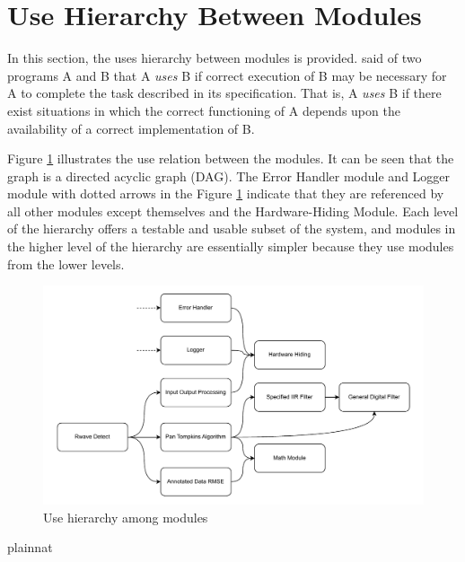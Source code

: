 \documentclass[12pt, titlepage]{article}
\begin{document}
\section{Use Hierarchy Between Modules} \label{SecUse}

In this section, the uses hierarchy between modules is provided.
\citet{Parnas1978} said of two programs A and B that A {\em uses} B if correct
execution of B may be necessary for A to complete the task described in its
specification. That is, A {\em uses} B if there exist situations in which the
correct functioning of A depends upon the availability of a correct
implementation of B.

Figure \ref{FigUH} illustrates the use relation between the modules. It can be
seen that the graph is a directed acyclic graph (DAG).  The Error Handler module
and Logger module with dotted arrows in the Figure \ref{FigUH} indicate that
they are referenced by all other modules except themselves and the
Hardware-Hiding Module.  Each level of the hierarchy offers a testable and
usable subset of the system, and modules in the higher level of the hierarchy
are essentially simpler because they use modules from the lower levels.


\begin{figure}[H]
\centering
\includegraphics[width=1.1\textwidth]{UsesHierarchy.pdf}
\caption{Use hierarchy among modules}
\label{FigUH}
\end{figure}




 {plainnat}


\newpage{}
\end{document}
